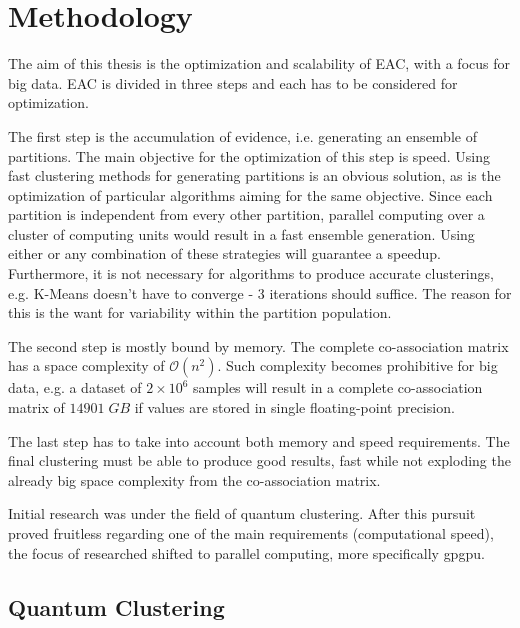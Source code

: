 

\section{Methodology}


The aim of this thesis is the optimization and scalability of EAC, with a focus for big data. EAC is divided in three steps and each has to be considered for optimization.

The first step is the accumulation of evidence, i.e. generating an ensemble of partitions. The main objective for the optimization of this step is speed. Using fast clustering methods for generating partitions is an obvious solution, as is the optimization of particular algorithms aiming for the same objective. Since each partition is independent from every other partition, parallel computing over a cluster of computing units would result in a fast ensemble generation. Using either or any combination of these strategies will guarantee a speedup. Furthermore, it is not necessary for algorithms to produce accurate clusterings, e.g. K-Means doesn't have to converge - 3 iterations should suffice. The reason for this is the want for variability within the partition population.
	
The second step is mostly bound by memory. The complete co-association matrix has a space complexity of $\mathcal{O}(n^2)$. Such complexity becomes prohibitive for big data, e.g. a dataset of $2 \times 10^6$ samples will result in a complete co-association matrix of $14901 \; GB$ if values are stored in single floating-point precision.

The last step has to take into account both memory and speed requirements. The final clustering must be able to produce good results, fast while not exploding the already big space complexity from the co-association matrix.

Initial research was under the field of quantum clustering. After this pursuit proved fruitless regarding one of the main requirements (computational speed), the focus of researched shifted to parallel computing, more specifically \gls{gpgpu}. 

\subsection{Quantum Clustering}

